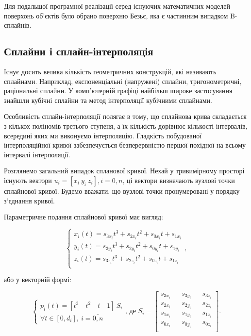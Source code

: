 \let\mypdfximage\pdfximage\def\pdfximage{\immediate\mypdfximage}\documentclass[14pt,a4paper]{extarticle}
\theoremstyle{definition}
\renewcommand{\[}{\begin{singlespace}\begin{equation*}}
\renewcommand{\]}{\end{equation*}\end{singlespace}}
\renewcommand{\+}{\discretionary{\mbox{\scriptsize$\hookleftarrow$}}{}{}}
\begin{document}
Для подальшої програмної реалізації серед існуючих математичних моделей поверхонь об'єктів було обрано поверхню Безьє, яка є частинним випадком B-сплайнів.

\subsection{Сплайни і сплайн-інтерполяція}

Існує досить велика кількість геометричних конструкцій, які називають сплайнами. Наприклад, експоненціальні (напружені) сплайни, тригонометричні, раціональні сплайни. У комп'ютерній графіці найбільш широке застосування знайшли кубічні сплайни та метод інтерполяції кубічними сплайнами.

Особливість сплайн-інтерполяції полягає в тому, що сплайнова крива складається з кількох поліномів третього ступеня, а їх кількість дорівнює кількості інтервалів, всередині яких ми виконуємо інтерполяцію. Гладкість побудованої інтерполяційної кривої забезпечується безперервністю першої похідної на всьому інтервалі інтерполяції.

Розглянемо загальний випадок спланової кривої. Нехай у тривимірному просторі існують вектори $u_i = [x_i\ y_i\ z_i], i=\overline{0,n}$, ці вектори визначають вузлові точки сплайнової кривої. Будемо вважати, що вузлові точки пронумеровані у порядку з’єднання кривої.


Параметричне подання сплайнової кривої має вигляд:
\[\left\{\begin{array}{l}
x_i(t)=s_{3x_i}t^3+s_{2x_i}t^2+s_{0x_i}t+s_{1x_i}\\
y_i(t)=s_{3y_i}t^3+s_{2y_i}t^2+s_{0y_i}t+s_{1y_i}\\
z_i(t)=s_{3z_i}t^3+s_{2z_i}t^2+s_{0z_i}t+s_{1z_i}\\
\end{array}\right.,\]
або у векторній формі:
\[\left\{\begin{array}{l}
p_i(t)=[t^3\quad t^2\quad t\quad 1]\ S_i\\
\forall t \in [0, d_i],\ i = \overline{0,n}
\end{array}\right.\text{, де }S_i=\left[\begin{matrix}
s_{3x_i} && s_{3y_i} && s_{3z_i} \\
s_{2x_i} && s_{2y_i} && s_{2z_i} \\
s_{1x_i} && s_{1y_i} && s_{1z_i} \\
s_{0x_i} && s_{0y_i} && s_{0z_i} \\
\end{matrix}\right].\]
\end{document}

